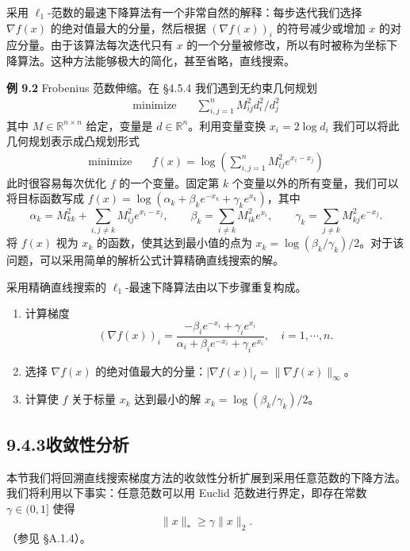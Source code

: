 \documentclass[UTF8, 12pt, fontset=fandol, oneside]{ctexart}
\begin{document}
采用 $\ell_1$-范数的最速下降算法有一个非常自然的解释：每步迭代我们选择 $\nabla f(x)$ 的绝对值最大的分量，然后根据 $(\nabla f(x))_i$ 的符号减少或增加 $x$ 的对应分量。由于该算法每次迭代只有 $x$ 的一个分量被修改，所以有时被称为坐标下降算法。这种方法能够极大的简化，甚至省略，直线搜索。

\noindent\textbf{例 9.2}\quad
Frobenius 范数伸缩。在 \S4.5.4 我们遇到无约束几何规划
\[
\begin{aligned}
\text{minimize}\quad & \sum_{i,j=1}^n M_{ij}^2d_i^2/d_j^2
\end{aligned}
\]
其中 $M\in\mathbb{R}^{n\times n}$ 给定，变量是 $d\in\mathbb{R}^n$。利用变量变换 $x_i=2\log d_i$ 我们可以将此几何规划表示成凸规划形式
\[
\begin{aligned}
\text{minimize}\quad & f(x)=\log\left(\sum_{i,j=1}^n M_{ij}^2e^{x_i-x_j}\right)
\end{aligned}
\]
此时很容易每次优化 $f$ 的一个变量。固定第 $k$ 个变量以外的所有变量，我们可以将目标函数写成 $f(x)=\log(\alpha_k+\beta_ke^{-x_k}+\gamma_ke^{x_k})$，其中
\[
\alpha_k=M_{kk}^2+\sum_{i,j\neq k}M_{ij}^2e^{x_i-x_j},\qquad
\beta_k=\sum_{i\neq k}M_{ik}^2e^{x_i},\qquad
\gamma_k=\sum_{j\neq k}M_{kj}^2e^{-x_j}.
\]
将 $f(x)$ 视为 $x_k$ 的函数，使其达到最小值的点为 $x_k=\log(\beta_k/\gamma_k)/2$。对于该问题，可以采用简单的解析公式计算精确直线搜索的解。

采用精确直线搜索的 $\ell_1$-最速下降算法由以下步骤重复构成。
\begin{enumerate}
\item 计算梯度
\[
(\nabla f(x))_i=\frac{-\beta_ie^{-x_i}+\gamma_ie^{x_i}}{\alpha_i+\beta_ie^{-x_i}+\gamma_ie^{x_i}},\quad i=1,\cdots,n.
\]
\item 选择 $\nabla f(x)$ 的绝对值最大的分量：$|\nabla f(x)|_\ell=\|\nabla f(x)\|_\infty$。
\item 计算使 $f$ 关于标量 $x_k$ 达到最小的解 $x_k=\log(\beta_k/\gamma_k)/2$。
\end{enumerate}

\subsection*{9.4.3\quad 收敛性分析}

本节我们将回溯直线搜索梯度方法的收敛性分析扩展到采用任意范数的下降方法。我们将利用以下事实：任意范数可以用 Euclid 范数进行界定，即存在常数 $\gamma\in(0,1]$ 使得
\[
\|x\|_\ast\geq\gamma\|x\|_2.
\]
（参见 \S A.1.4）。
\end{document}
